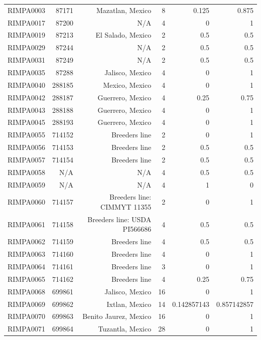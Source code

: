 \documentclass[11pt]{article}
\begin{document}
\begin{linenumbers}
\begin{flushleft}
\begin{table}[htbp]
\begin{tabular}{rrrrrr}
    RIMPA0003 & 87171 & Mazatlan, Mexico & 8     & 0.125 & 0.875 \\
    RIMPA0017 & 87200 & N/A   & 4     & 0     & 1 \\
    RIMPA0019 & 87213 & El Salado, Mexico & 2     & 0.5   & 0.5 \\
    RIMPA0029 & 87244 & N/A   & 2     & 0.5   & 0.5 \\
    RIMPA0031 & 87249 & N/A   & 2     & 0.5   & 0.5 \\
    RIMPA0035 & 87288 & Jalisco, Mexico & 4     & 0     & 1 \\
    RIMPA0040 & 288185 & Mexico, Mexico & 4     & 0     & 1 \\
    RIMPA0042 & 288187 & Guerrero, Mexico & 4     & 0.25  & 0.75 \\
    RIMPA0043 & 288188 & Guerrero, Mexico & 4     & 0     & 1 \\
    RIMPA0045 & 288193 & Guerrero, Mexico & 4     & 0     & 1 \\
    RIMPA0055 & 714152 & Breeders line & 2     & 0     & 1 \\
    RIMPA0056 & 714153 & Breeders line & 2     & 0.5   & 0.5 \\
    RIMPA0057 & 714154 & Breeders line & 2     & 0.5   & 0.5 \\
    RIMPA0058 & N/A   & N/A   & 4     & 0.5   & 0.5 \\
    RIMPA0059 & N/A   & N/A   & 4     & 1     & 0 \\
    RIMPA0060 & 714157 & Breeders line: CIMMYT 11355 & 2     & 0     & 1 \\
    RIMPA0061 & 714158 & Breeders line: USDA PI566686 & 4     & 0.5   & 0.5 \\
    RIMPA0062 & 714159 & Breeders line & 4     & 0.5   & 0.5 \\
    RIMPA0063 & 714160 & Breeders line & 4     & 0     & 1 \\
    RIMPA0064 & 714161 & Breeders line & 3     & 0     & 1 \\
    RIMPA0065 & 714162 & Breeders line & 4     & 0.25  & 0.75 \\
    RIMPA0068 & 699861 & Jalisco, Mexico & 16    & 0     & 1 \\
    RIMPA0069 & 699862 & Ixtlan, Mexico & 14    & 0.142857143 & 0.857142857 \\
    RIMPA0070 & 699863 & Benito Jaurez, Mexico & 16    & 0     & 1 \\
    RIMPA0071 & 699864 & Tuzantla, Mexico & 28    & 0     & 1 \\

\end{tabular}
\end{table}
\end{flushleft}
\end{linenumbers}
\end{document}
